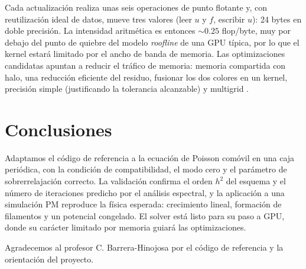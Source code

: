 \documentclass{aa}
\begin{document}
Cada actualización realiza unas seis operaciones de punto flotante y, con reutilización ideal de datos, mueve tres valores (leer $u$ y $f$, escribir $u$): 24 bytes en doble precisión. La intensidad aritmética es entonces $\sim0.25$ flop/byte, muy por debajo del punto de quiebre del modelo \emph{roofline} de una GPU típica, por lo que el kernel estará limitado por el ancho de banda de memoria. Las optimizaciones candidatas apuntan a reducir el tráfico de memoria: memoria compartida con halo, una reducción eficiente del residuo, fusionar los dos colores en un kernel, precisión simple (justificando la tolerancia alcanzable) y multigrid \citep{Briggs2000}.

\section{Conclusiones}

Adaptamos el código de referencia a la ecuación de Poisson comóvil en una caja periódica, con la condición de compatibilidad, el modo cero y el parámetro de sobrerrelajación correcto. La validación confirma el orden $h^2$ del esquema y el número de iteraciones predicho por el análisis espectral, y la aplicación a una simulación PM reproduce la física esperada: crecimiento lineal, formación de filamentos y un potencial congelado. El solver está listo para su paso a GPU, donde su carácter limitado por memoria guiará las optimizaciones.

\begin{acknowledgements}
Agradecemos al profesor C. Barrera-Hinojosa por el código de referencia y la orientación del proyecto.
\end{acknowledgements}





\end{document}
